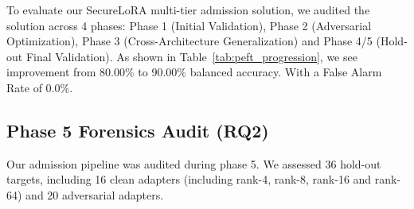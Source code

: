 \documentclass[conference]{IEEEtran}
\begin{document}
To evaluate our SecureLoRA multi-tier admission solution, we audited the solution across 4 phases: Phase 1 (Initial Validation), Phase 2 (Adversarial Optimization), Phase 3 (Cross-Architecture Generalization) and Phase 4/5 (Hold-out Final Validation). As shown in Table~\ref{tab:peft_progression}, we see improvement from 80.00\% to 90.00\% balanced accuracy. With a False Alarm Rate of 0.0\%.

\begin{table}[t]
\centering
\caption{Performance Across Physical \& Functional PEFT Targets}
\label{tab:peft_progression}
\end{table}

\subsection{Phase 5 Forensics Audit (RQ2)}
\label{subsec:exp_phase5}

Our admission pipeline was audited during phase 5. We assessed 36 hold-out targets, including 16 clean adapters (including rank-4, rank-8, rank-16 and rank-64) and 20 adversarial adapters.
\end{document}
